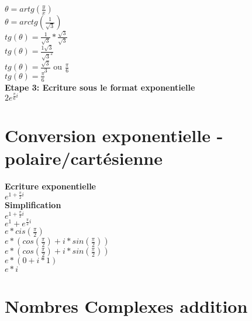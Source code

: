 $\theta = artg(\frac{y}{x})$ \\

$\theta = arctg(\frac{1}{\sqrt{3}})$ \\

$tg(\theta) = \frac{1}{\sqrt{3}} * \frac{\sqrt{3}}{\sqrt{3}}$ \\

$tg(\theta) = \frac{1\sqrt{3}}{\sqrt{3}^{2}}$ \\

$tg(\theta) = \frac{\sqrt{3}}{3}$ ou $\frac{\pi}{6} $ \\

$tg(\theta) = \frac{\pi}{6} $ \\

\vspace{5mm}
\textbf{Etape 3: Ecriture sous le format exponentielle} \\

$2e^{\frac{\pi}{6}i}$

\newpage
\section{Conversion exponentielle - polaire/cartésienne }
\vspace{3mm} %

\textbf{Ecriture exponentielle} \\

$e^{1+\frac{\pi}{2}i}$ \\

\textbf{Simplification} \\

$e^{1+\frac{\pi}{2}i}$ \\

$e^{1} + e^{\frac{\pi}{2}i}$ \\

$e*cis(\frac{\pi}{2})$ \\

$e*(cos(\frac{\pi}{2}) + i*sin(\frac{\pi}{2})) $ \\

$e*(cos(\frac{\pi}{2}) + i*sin(\frac{\pi}{2})) $ \\

$e*(0 + i*1) $ \\

$e*i $ \\

\newpage
\section{Nombres Complexes addition}
\vspace{3mm} %

